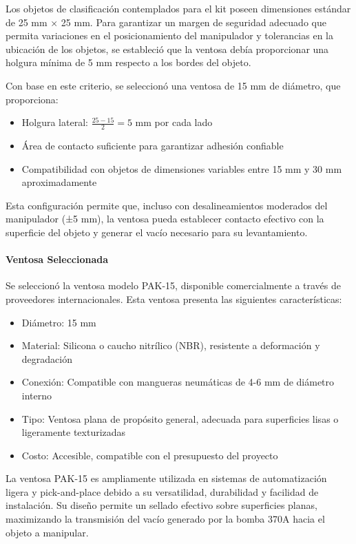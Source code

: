 Los objetos de clasificación contemplados para el kit poseen dimensiones estándar de 25 mm × 25 mm. Para garantizar un margen de seguridad adecuado que permita variaciones en el posicionamiento del manipulador y tolerancias en la ubicación de los objetos, se estableció que la ventosa debía proporcionar una holgura mínima de 5 mm respecto a los bordes del objeto.

Con base en este criterio, se seleccionó una ventosa de 15 mm de diámetro, que proporciona:

\begin{itemize}
    \item Holgura lateral: $\frac{25 - 15}{2} = 5$ mm por cada lado
    \item Área de contacto suficiente para garantizar adhesión confiable
    \item Compatibilidad con objetos de dimensiones variables entre 15 mm y 30 mm aproximadamente
\end{itemize}

Esta configuración permite que, incluso con desalineamientos moderados del manipulador (±5 mm), la ventosa pueda establecer contacto efectivo con la superficie del objeto y generar el vacío necesario para su levantamiento.

\paragraph{Ventosa Seleccionada}

Se seleccionó la ventosa modelo PAK-15, disponible comercialmente a través de proveedores internacionales. Esta ventosa presenta las siguientes características:

\begin{itemize}
    \item Diámetro: 15 mm
    \item Material: Silicona o caucho nitrílico (NBR), resistente a deformación y degradación
    \item Conexión: Compatible con mangueras neumáticas de 4-6 mm de diámetro interno
    \item Tipo: Ventosa plana de propósito general, adecuada para superficies lisas o ligeramente texturizadas
    \item Costo: Accesible, compatible con el presupuesto del proyecto
\end{itemize}

La ventosa PAK-15 es ampliamente utilizada en sistemas de automatización ligera y pick-and-place debido a su versatilidad, durabilidad y facilidad de instalación. Su diseño permite un sellado efectivo sobre superficies planas, maximizando la transmisión del vacío generado por la bomba 370A hacia el objeto a manipular.

